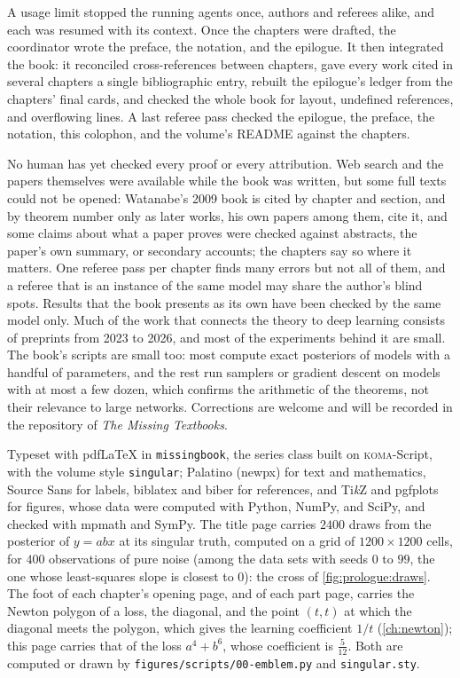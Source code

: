 A usage limit stopped the running agents once, authors and referees alike, and each was resumed with its context. Once the chapters were drafted, the coordinator wrote the preface, the notation, and the epilogue. It then integrated the book: it reconciled cross-references between chapters, gave every work cited in several chapters a single bibliographic entry, rebuilt the epilogue's ledger from the chapters' final cards, and checked the whole book for layout, undefined references, and overflowing lines. A last referee pass checked the epilogue, the preface, the notation, this colophon, and the volume's README against the chapters.


No human has yet checked every proof or every attribution. Web search and the papers themselves were available while the book was written, but some full texts could not be opened: Watanabe's 2009 book is cited by chapter and section, and by theorem number only as later works, his own papers among them, cite it, and some claims about what a paper proves were checked against abstracts, the paper's own summary, or secondary accounts; the chapters say so where it matters. One referee pass per chapter finds many errors but not all of them, and a referee that is an instance of the same model may share the author's blind spots. Results that the book presents as its own have been checked by the same model only. Much of the work that connects the theory to deep learning consists of preprints from 2023 to 2026, and most of the experiments behind it are small. The book's scripts are small too: most compute exact posteriors of models with a handful of parameters, and the rest run samplers or gradient descent on models with at most a few dozen, which confirms the arithmetic of the theorems, not their relevance to large networks. Corrections are welcome and will be recorded in the repository of \emph{The Missing Textbooks}.

\medskip
{\small\noindent Typeset with pdf\LaTeX{} in \texttt{missingbook}, the series class built on \textsc{koma}-Script, with the volume style \texttt{singular}; Palatino (newpx) for text and mathematics, Source Sans for labels, biblatex and biber for references, and Ti\emph{k}Z and pgfplots for figures, whose data were computed with Python, NumPy, and SciPy, and checked with mpmath and SymPy. The title page carries $2400$ draws from the posterior of $y=abx$ at its singular truth, computed on a grid of $1200\times1200$ cells, for $400$ observations of pure noise (among the data sets with seeds $0$ to $99$, the one whose least-squares slope is closest to $0$): the cross of \cref{fig:prologue:draws}. The foot of each chapter's opening page, and of each part page, carries the Newton polygon of a loss, the diagonal, and the point $(t,t)$ at which the diagonal meets the polygon, which gives the learning coefficient $1/t$ (\cref{ch:newton}); this page carries that of the loss $a^4+b^6$, whose coefficient is $\frac5{12}$. Both are computed or drawn by \texttt{figures/scripts/00-emblem.py} and \texttt{singular.sty}.\par}
